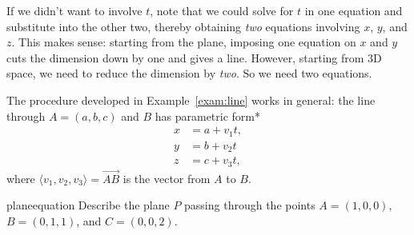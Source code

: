 \documentclass[prettycode,shellescape]{watsonbook}
\begin{document}
If we didn't want to involve $t$, note that we could solve for $t$ in
one equation and substitute into the other two, thereby obtaining
\textit{two} equations involving $x$, $y$, and $z$. This makes sense:
starting from the plane, imposing one equation on $x$ and $y$ cuts the
dimension down by one and gives a line. However, starting from 3D
space, we need to reduce the dimension by \textit{two}. So we need
two equations.

The procedure developed in Example~\ref{exam:line} works in general:
the line through $A = (a,b,c)$ and $B$ has parametric form*
\begin{align*}
  x &= a + v_1 t, \\
  y &= b + v_2 t \\ 
  z &= c + v_3 t, 
\end{align*}
where $\langle v_1, v_2, v_3 \rangle = \overrightarrow{AB}$ is the
vector from $A$ to $B$.

\begin{example}{}{planeequation}
  Describe the plane $P$ passing through the points $A = (1,0,0)$, $B =
  (0,1,1)$, and $C = (0,0,2)$.
\end{example}
\end{document}
